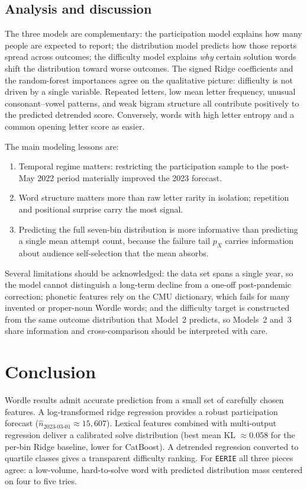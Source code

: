 \documentclass{article}
\begin{document}
\subsection*{Analysis and discussion}

The three models are complementary: the participation model explains how many
people are expected to report; the distribution model predicts how those
reports spread across outcomes; the difficulty model explains \emph{why}
certain solution words shift the distribution toward worse outcomes. The signed
Ridge coefficients and the random-forest importances agree on the qualitative
picture: difficulty is not driven by a single variable. Repeated letters, low
mean letter frequency, unusual consonant--vowel patterns, and weak bigram
structure all contribute positively to the predicted detrended score.
Conversely, words with high letter entropy and a common opening letter score
as easier.

The main modeling lessons are:
\begin{enumerate}
  \item Temporal regime matters: restricting the participation sample to the
        post-May 2022 period materially improved the 2023 forecast.
  \item Word structure matters more than raw letter rarity in isolation;
        repetition and positional surprise carry the most signal.
  \item Predicting the full seven-bin distribution is more informative than
        predicting a single mean attempt count, because the failure tail $p_X$
        carries information about audience self-selection that the mean
        absorbs.
\end{enumerate}

Several limitations should be acknowledged: the data set spans a single year,
so the model cannot distinguish a long-term decline from a one-off
post-pandemic correction; phonetic features rely on the CMU dictionary, which
fails for many invented or proper-noun Wordle words; and the difficulty target
is constructed from the same outcome distribution that Model~2 predicts, so
Models~2 and~3 share information and cross-comparison should be interpreted
with care.

\section{Conclusion}

Wordle results admit accurate prediction from a small set of carefully chosen
features. A log-transformed ridge regression provides a robust participation
forecast (\(\widehat{n}_{2023\text{-}03\text{-}01}\approx 15{,}607\)). Lexical
features combined with multi-output regression deliver a calibrated solve
distribution (best mean KL $\approx 0.058$ for the per-bin Ridge baseline,
lower for CatBoost). A detrended regression converted to quartile classes
gives a transparent difficulty ranking. For \texttt{EERIE} all three pieces
agree: a low-volume, hard-to-solve word with predicted distribution mass
centered on four to five tries.
\end{document}
